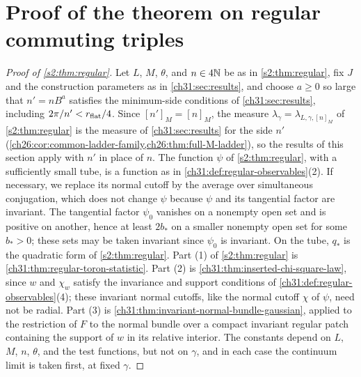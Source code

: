 \section{Proof of the theorem on regular commuting triples}\label{ch31:sec:proof-s2}

\begin{proof}[Proof of \cref{s2:thm:regular}]
Let $L$, $M$, $\theta$, and $n\in4\mathbb N$ be as in \cref{s2:thm:regular}, fix $J$ and the construction parameters as in \cref{ch31:sec:results}, and choose $a\ge0$ so large that $n'=nB^a$ satisfies the minimum-side conditions of \cref{ch31:sec:results}, including $2\pi/n'<r_{\rm flat}/4$. Since $[n']_M=[n]_M$, the measure $\lambda_\gamma=\lambda_{L,\gamma,[n]_M}$ of \cref{s2:thm:regular} is the measure of \cref{ch31:sec:results} for the side $n'$ (\cref{ch26:cor:common-ladder-family,ch26:thm:full-M-ladder}), so the results of this section apply with $n'$ in place of $n$. The function $\psi$ of \cref{s2:thm:regular}, with a sufficiently small tube, is a function as in \cref{ch31:def:regular-observables}(2). If necessary, we replace its normal cutoff by the average over simultaneous conjugation, which does not change $\psi$ because $\psi$ and its tangential factor are invariant. The tangential factor $\psi_0$ vanishes on a nonempty open set and is positive on another, hence at least $2b_*$ on a smaller nonempty open set for some $b_*>0$; these sets may be taken invariant since $\psi_0$ is invariant. On the tube, $q_*$ is the quadratic form of \cref{s2:thm:regular}. Part (1) of \cref{s2:thm:regular} is \cref{ch31:thm:regular-toron-statistic}. Part (2) is \cref{ch31:thm:inserted-chi-square-law}, since $w$ and $\chi_w$ satisfy the invariance and support conditions of \cref{ch31:def:regular-observables}(4); these invariant normal cutoffs, like the normal cutoff $\chi$ of $\psi$, need not be radial. Part (3) is \cref{ch31:thm:invariant-normal-bundle-gaussian}, applied to the restriction of $F$ to the normal bundle over a compact invariant regular patch containing the support of $w$ in its relative interior. The constants depend on $L$, $M$, $n$, $\theta$, and the test functions, but not on $\gamma$, and in each case the continuum limit is taken first, at fixed $\gamma$.
\end{proof}
